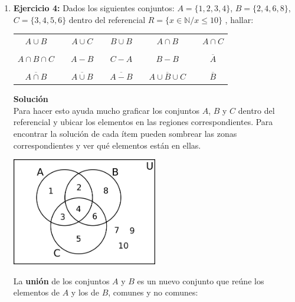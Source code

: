 \documentclass[12pt]{article}
\theoremstyle{definition}
\begin{document}
\begin{enumerate}
\item  \textbf{Ejercicio 4:} Dados los siguientes conjuntos: $A= \{ 1,2,3,4 \}$, $B= \{ 2,4,6,8 \}$, $C = \{ 3,4,5,6 \}$  dentro del referencial $R = \{x \in \mathbb{N} /  x \leq 10 \}$ , hallar:
\begin{table}[ H]
\begin{center} 
\begin{tabular} { c c c c c c c c c }
 $A \cup B$ &&  $A \cup C$ &&  $B \cup B$ && $A \cap B$ && $A \cap C$ \\ \\
 $A \cap B \cap C$ &&  $A  - B $ &&  $C - A$ && $B - B$ && $ \overline A$ \\ \\
 $ \overline {A \cap B}$ &&  $ \overline {A \cup B}$ &&  $ \overline {A -B}$ && $ \overline {A \cup B \cup C}$ && $ \overline B$ \end{tabular} 
\end{center} 
\end{table}
\noindent
\textbf{Solución} \\
Para hacer esto ayuda mucho graficar los conjuntos $A$, $B$ y $C$ dentro del referencial y ubicar los elementos en las regiones correspondientes. Para encontrar la solución de cada ítem pueden sombrear las zonas correspondientes y ver qué elementos están en ellas.\\
 \begin{center} 
\includegraphics[width=0.5\textwidth]{tp_1_sol_f1.png} 
\end{center}
La \textbf{unión} de los conjuntos $A$ y $B$ es un nuevo conjunto que reúne los elementos de $A$ y los de $B$, comunes y no comunes:\\


\end{enumerate}
\end{document}

